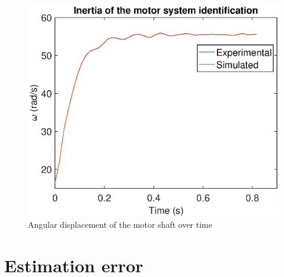 \documentclass{UoNMCHA}
\numberwithin{equation}{section}
\begin{document}
\begin{figure}[!h]
	\begin{center}
		\includegraphics[width=.5\linewidth]{figs/findJ}
		\caption{Angular displacement of the motor shaft over time}
		\label{phi}
	\end{center}
\end{figure}

\newpage
\section{Estimation error}\label{Estimation error}

\begin{figure}[!h]
	\begin{floatrow}
	\end{floatrow}
\end{figure}
\end{document}
